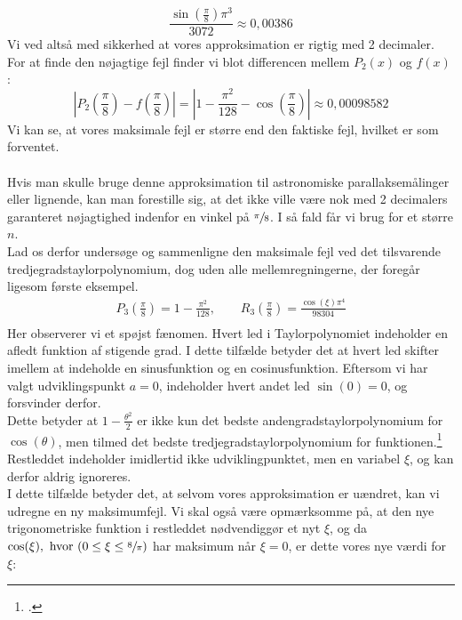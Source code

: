 \documentclass[12pt, a4paper]{article}
\begin{document}
\begin{refsection}
\begin{equation*}
    \frac{\sin\left(\frac{\pi}{8}\right)\pi^3}{3072}\approx 0{,}00386
\end{equation*}
Vi ved altså med sikkerhed at vores approksimation er rigtig med 2 decimaler.\\
For at finde den nøjagtige fejl finder vi blot differencen mellem $P_2(x)$ og $f(x)$ :
\begin{equation}\label{faktiskfejl}
    \left|P_2\left(\frac{\pi}{8}\right)-f\left(\frac{\pi}{8}\right)\right|=\left|1-\frac{\pi^2}{128}-\cos\left(\frac{\pi}{8} \right)   \right|\approx 0{,}00098582
\end{equation}
Vi kan se, at vores maksimale fejl er større end den faktiske fejl, hvilket er som forventet.\\
\\
Hvis man skulle bruge denne approksimation til astronomiske parallaksemålinger eller lignende, kan man forestille sig, at det ikke ville være nok med 2 decimalers garanteret nøjagtighed indenfor en vinkel på $\sfrac{\pi}{8}$. I så fald får vi brug for et større $n$.\\
Lad os derfor undersøge og sammenligne den maksimale fejl ved det tilsvarende tredjegradstaylorpolynomium, dog uden alle mellemregningerne, der foregår ligesom første eksempel.
    \begin{align*}
        P_3\left(\frac{\pi}{8}\right)=1-\frac{\pi^2}{128}, \quad \quad R_3\left(\frac{\pi}{8}\right)=\frac{\cos(\xi)\pi^4}{98304}\\
    \end{align*}
    Her observerer vi et spøjst fænomen. Hvert led i Taylorpolynomiet indeholder en afledt funktion af stigende grad. I dette tilfælde betyder det at hvert led skifter imellem at indeholde en sinusfunktion og en cosinusfunktion. Eftersom vi har valgt udviklingspunkt $a=0$, indeholder hvert andet led $\sin(0)=0$, og forsvinder derfor.\\
    Dette betyder at  $1-\frac{\theta^2}{2}$ er ikke kun det bedste andengradstaylorpolynomium for $\cos(\theta)$, men tilmed det bedste tredjegradstaylorpolynomium for funktionen.\footcite{3blue1browntaylor}\\
    Restleddet indeholder imidlertid ikke udviklingpunktet, men en variabel  $\xi$, og kan derfor aldrig ignoreres.\\
    I dette tilfælde betyder det, at selvom vores approksimation er uændret, kan vi udregne en ny maksimumfejl. Vi skal også være opmærksomme på, at den nye trigonometriske funktion i restleddet nødvendiggør et nyt $\xi$, og da  $\cos(\xi), \text{ hvor }(0\leq \xi \leq \sfrac{8}{\pi})$ har maksimum når $\xi=0$, er dette vores nye værdi for $\xi$:

\end{refsection}
\end{document}
